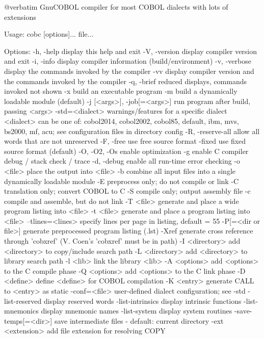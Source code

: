 @verbatim
GnuCOBOL compiler for most COBOL dialects with lots of extensions

Usage: cobc [options]... file...

Options:
  -h, -help             display this help and exit
  -V, -version          display compiler version and exit
  -i, -info             display compiler information (build/environment)
  -v, -verbose          display the commands invoked by the compiler
  -vv                   display compiler version and the commands
                        invoked by the compiler
  -q, -brief            reduced displays, commands invoked not shown
  -x                    build an executable program
  -m                    build a dynamically loadable module (default)
  -j [<args>], -job[=<args>] run program after build, passing <args>
  -std=<dialect>        warnings/features for a specific dialect
                        <dialect> can be one of:
                        cobol2014, cobol2002, cobol85, default,
                        ibm, mvs, bs2000, mf, acu;
                        see configuration files in directory config
  -R, -reserve-all      allow all words that are not unreserved
  -F, -free             use free source format
  -fixed                use fixed source format (default)
  -O, -O2, -Os          enable optimization
  -g                    enable C compiler debug / stack check / trace
  -d, -debug            enable all run-time error checking
  -o <file>             place the output into <file>
  -b                    combine all input files into a single
                        dynamically loadable module
  -E                    preprocess only; do not compile or link
  -C                    translation only; convert COBOL to C
  -S                    compile only; output assembly file
  -c                    compile and assemble, but do not link
  -T <file>             generate and place a wide program listing into <file>
  -t <file>             generate and place a program listing into <file>
  --tlines=<lines>      specify lines per page in listing, default = 55
  -P[=<dir or file>]    generate preprocessed program listing (.lst)
  -Xref                 generate cross reference through 'cobxref'
                        (V. Coen's 'cobxref' must be in path)
  -I <directory>        add <directory> to copy/include search path
  -L <directory>        add <directory> to library search path
  -l <lib>              link the library <lib>
  -A <options>          add <options> to the C compile phase
  -Q <options>          add <options> to the C link phase
  -D <define>           define <define> for COBOL compilation
  -K <entry>            generate CALL to <entry> as static
  -conf=<file>          user-defined dialect configuration; see -std
  -list-reserved        display reserved words
  -list-intrinsics      display intrinsic functions
  -list-mnemonics       display mnemonic names
  -list-system          display system routines
  -save-temps[=<dir>]   save intermediate files
                        - default: current directory
  -ext <extension>      add file extension for resolving COPY

